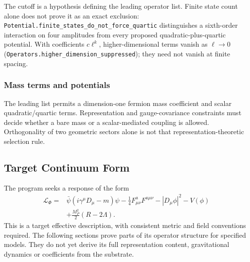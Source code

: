The cutoff is a hypothesis defining the leading operator list. Finite state count alone does not prove it as an exact exclusion: \nolinkurl{Potential.finite_states_do_not_force_quartic} distinguishes a sixth-order interaction on four amplitudes from every proposed quadratic-plus-quartic potential. With coefficients $c\ell^k$, higher-dimensional terms vanish as $\ell\to0$ (\nolinkurl{Operators.higher_dimension_suppressed}); they need not vanish at finite spacing.

\subsubsection{Mass terms and potentials}
\label{subsec:restmass}
The leading list permits a dimension-one fermion mass coefficient and scalar quadratic/quartic terms. Representation and gauge-covariance constraints must decide whether a bare mass or a scalar-mediated coupling is allowed. Orthogonality of two geometric sectors alone is not that representation-theoretic selection rule.

\subsection{Target Continuum Form}
\label{subsec:the_target}
The program seeks a response of the form
\begin{equation}
\begin{aligned}
 \mathcal L_\Phi={}&\bar\psi(i\gamma^\mu D_\mu-m)\psi
 -\tfrac14 F^a_{\mu\nu}F^{a\mu\nu}
 -|D_\mu\phi|^2-V(\phi)\\
 &+\tfrac{M_P^2}{2}(R-2\Lambda).
\end{aligned}
\label{eq:entropic_lagrangian}
\end{equation}
This is a target effective description, with consistent metric and field conventions required. The following sections prove parts of its operator structure for specified models. They do not yet derive its full representation content, gravitational dynamics or coefficients from the substrate.
